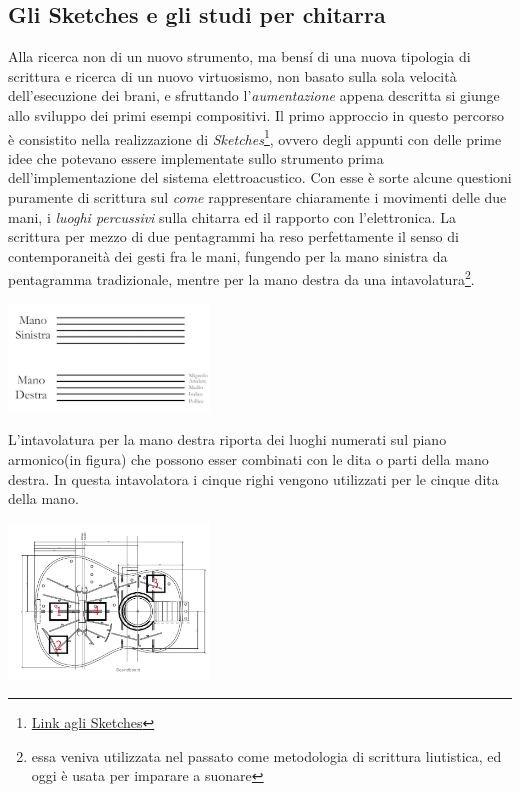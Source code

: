\documentclass[oneside]{article}
\begin{document}
\begin{multicols*}{2}
\section{ Gli Sketches e gli studi per chitarra}
Alla ricerca non di un nuovo strumento, ma bensí di una nuova tipologia di scrittura e ricerca di un nuovo virtuosismo, non basato sulla sola velocità dell’esecuzione dei brani, e  sfruttando l'\textit{aumentazione} appena descritta si giunge allo sviluppo dei primi esempi compositivi.
Il primo approccio in questo percorso è consistito nella realizzazione di \textit{Sketches}\footnote{\href{https://github.com/SMERM/BN-Tedesco/blob/master/COME-02/Lezioni_in_Compresenza/20200324/Sketches.pdf}{Link agli Sketches}}, ovvero degli appunti con delle prime idee che potevano essere implementate sullo strumento prima dell'implementazione del sistema elettroacustico. Con esse è sorte alcune questioni puramente di scrittura sul \textit{come} rappresentare chiaramente i movimenti delle due mani, i \textit{luoghi percussivi} sulla chitarra ed il rapporto con l'elettronica.
La scrittura per mezzo di due pentagrammi ha reso perfettamente il senso di contemporaneità dei gesti fra le mani, fungendo per la mano sinistra da pentagramma tradizionale, mentre per la mano destra da una intavolatura\footnote{essa veniva utilizzata nel passato come metodologia di scrittura liutistica, ed oggi è usata per imparare a suonare}. 

\includegraphics[width=0.4\textwidth]{img/legenda.png}

L'intavolatura per la mano destra riporta dei luoghi numerati sul piano armonico(in figura) che possono esser combinati con le dita o parti della mano destra. In questa intavolatora i cinque righi vengono utilizzati per le cinque dita della mano. 

\includegraphics[width=0.4\textwidth]{img/luoghi_perc.png}


\end{multicols*}
\end{document}
